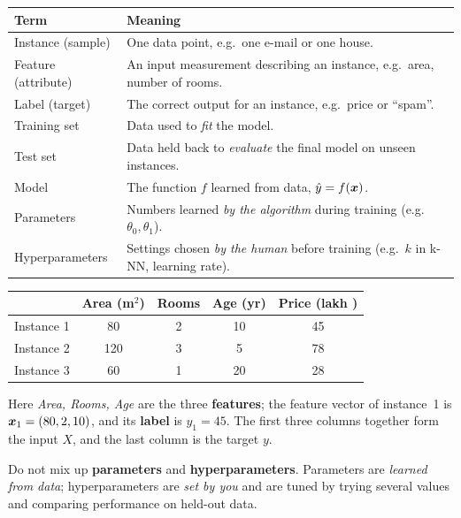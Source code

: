 \begin{center}
\begin{tabular}{@{}p{3.3cm}p{10.2cm}@{}}
\toprule
\textbf{Term} & \textbf{Meaning}\\
\midrule
Instance (sample) & One data point, e.g.\ one e-mail or one house.\\
Feature (attribute) & An input measurement describing an instance, e.g.\ area, number of rooms.\\
Label (target) & The correct output for an instance, e.g.\ price or ``spam''.\\
Training set & Data used to \emph{fit} the model.\\
Test set & Data held back to \emph{evaluate} the final model on unseen instances.\\
Model & The function $f$ learned from data, $\hat y = f(\boldsymbol{x})$.\\
Parameters & Numbers learned \emph{by the algorithm} during training (e.g.\ $\theta_0,\theta_1$).\\
Hyperparameters & Settings chosen \emph{by the human} before training (e.g.\ $k$ in k-NN, learning rate).\\
\bottomrule
\end{tabular}
\end{center}

\begin{example}
\begin{center}
\begin{tabular}{@{}cccc|c@{}}
\toprule
 & \textbf{Area (m$^2$)} & \textbf{Rooms} & \textbf{Age (yr)} & \textbf{Price (lakh \rupee{})}\\
\midrule
Instance 1 & 80 & 2 & 10 & 45\\
Instance 2 & 120 & 3 & 5 & 78\\
Instance 3 & 60 & 1 & 20 & 28\\
\bottomrule
\end{tabular}
\end{center}
Here \emph{Area, Rooms, Age} are the three \textbf{features}; the feature vector of instance~1 is $\boldsymbol{x}_1=(80,2,10)$, and its \textbf{label} is $y_1=45$. The first three columns together form the input $X$, and the last column is the target $y$.
\end{example}

\begin{warning}
Do not mix up \textbf{parameters} and \textbf{hyperparameters}. Parameters are \emph{learned from data}; hyperparameters are \emph{set by you} and are tuned by trying several values and comparing performance on held-out data.
\end{warning}

